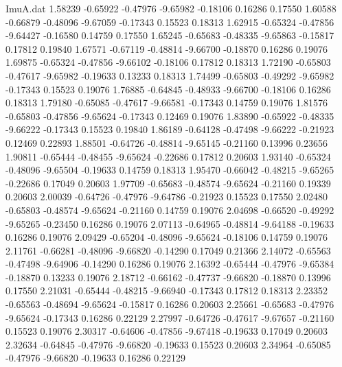 \begin{filecontents}{ImuA.dat}
   1.58239   -0.65922   -0.47976   -9.65982   -0.18106    0.16286    0.17550
   1.60588   -0.66879   -0.48096   -9.67059   -0.17343    0.15523    0.18313
   1.62915   -0.65324   -0.47856   -9.64427   -0.16580    0.14759    0.17550
   1.65245   -0.65683   -0.48335   -9.65863   -0.15817    0.17812    0.19840
   1.67571   -0.67119   -0.48814   -9.66700   -0.18870    0.16286    0.19076
   1.69875   -0.65324   -0.47856   -9.66102   -0.18106    0.17812    0.18313
   1.72190   -0.65803   -0.47617   -9.65982   -0.19633    0.13233    0.18313
   1.74499   -0.65803   -0.49292   -9.65982   -0.17343    0.15523    0.19076
   1.76885   -0.64845   -0.48933   -9.66700   -0.18106    0.16286    0.18313
   1.79180   -0.65085   -0.47617   -9.66581   -0.17343    0.14759    0.19076
   1.81576   -0.65803   -0.47856   -9.65624   -0.17343    0.12469    0.19076
   1.83890   -0.65922   -0.48335   -9.66222   -0.17343    0.15523    0.19840
   1.86189   -0.64128   -0.47498   -9.66222   -0.21923    0.12469    0.22893
   1.88501   -0.64726   -0.48814   -9.65145   -0.21160    0.13996    0.23656
   1.90811   -0.65444   -0.48455   -9.65624   -0.22686    0.17812    0.20603
   1.93140   -0.65324   -0.48096   -9.65504   -0.19633    0.14759    0.18313
   1.95470   -0.66042   -0.48215   -9.65265   -0.22686    0.17049    0.20603
   1.97709   -0.65683   -0.48574   -9.65624   -0.21160    0.19339    0.20603
   2.00039   -0.64726   -0.47976   -9.64786   -0.21923    0.15523    0.17550
   2.02480   -0.65803   -0.48574   -9.65624   -0.21160    0.14759    0.19076
   2.04698   -0.66520   -0.49292   -9.65265   -0.23450    0.16286    0.19076
   2.07113   -0.64965   -0.48814   -9.64188   -0.19633    0.16286    0.19076
   2.09429   -0.65204   -0.48096   -9.65624   -0.18106    0.14759    0.19076
   2.11761   -0.66281   -0.48096   -9.66820   -0.14290    0.17049    0.21366
   2.14072   -0.65563   -0.47498   -9.64906   -0.14290    0.16286    0.19076
   2.16392   -0.65444   -0.47976   -9.65384   -0.18870    0.13233    0.19076
   2.18712   -0.66162   -0.47737   -9.66820   -0.18870    0.13996    0.17550
   2.21031   -0.65444   -0.48215   -9.66940   -0.17343    0.17812    0.18313
   2.23352   -0.65563   -0.48694   -9.65624   -0.15817    0.16286    0.20603
   2.25661   -0.65683   -0.47976   -9.65624   -0.17343    0.16286    0.22129
   2.27997   -0.64726   -0.47617   -9.67657   -0.21160    0.15523    0.19076
   2.30317   -0.64606   -0.47856   -9.67418   -0.19633    0.17049    0.20603
   2.32634   -0.64845   -0.47976   -9.66820   -0.19633    0.15523    0.20603
   2.34964   -0.65085   -0.47976   -9.66820   -0.19633    0.16286    0.22129

\end{filecontents}
